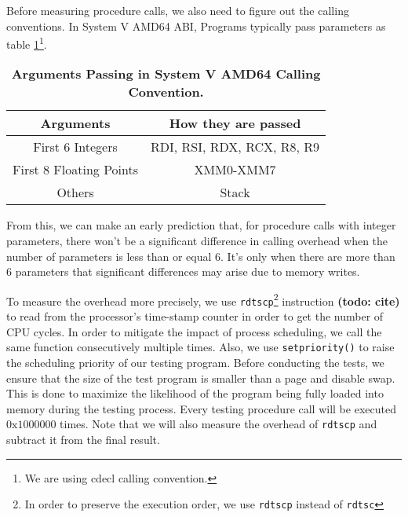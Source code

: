 Before measuring procedure calls, we also need to figure out the calling conventions. In System V AMD64 ABI, Programs typically pass parameters as table \ref{table:calling-convention-reg}\footnote{We are using cdecl calling convention.}.
\begin{table}[h]
	\centering
	\begin{tabular}{c|c}
		\hline
		\bf{Arguments} & \bf{How they are passed} \\ \hline
		
		First 6 Integers & RDI, RSI, RDX, RCX, R8, R9 \\ \hline

		First 8 Floating Points & XMM0-XMM7 \\ \hline
		
		Others & Stack \\ \hline
	\end{tabular}
	\caption{\textbf{Arguments Passing in System V AMD64 Calling Convention.}}
	\label{table:calling-convention-reg}
\end{table}
From this, we can make an early prediction that, for procedure calls with integer parameters, there won't be a significant difference in calling overhead when the number of parameters is less than or equal 6. It's only when there are more than 6 parameters that significant differences may arise due to memory writes.

To measure the overhead more precisely, we use \texttt{rdtscp}\footnote{In order to preserve the execution order, we use \texttt{rdtscp} instead of \texttt{rdtsc}} instruction \textbf{(todo: cite)} to read from the processor’s time-stamp counter in order to get the number of CPU cycles. In order to mitigate the impact of process scheduling, we call the same function consecutively multiple times. Also, we use \texttt{setpriority()} to raise the scheduling priority of our testing program. Before conducting the tests, we ensure that the size of the test program is smaller than a page and disable swap. This is done to maximize the likelihood of the program being fully loaded into memory during the testing process. Every testing procedure call will be executed $0\text{x}1000000$ times. Note that we will also measure the overhead of \texttt{rdtscp} and subtract it from the final result. 

